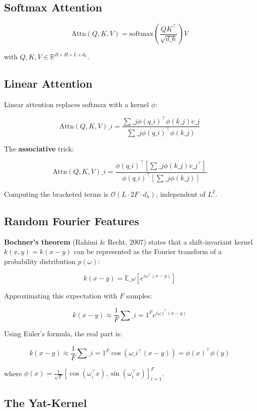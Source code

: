 \subsection{Softmax Attention}

\[
\text{Attn}(Q, K, V) = \text{softmax}\!\left(\frac{Q K^\top}{\sqrt{d\_h}}\right) V
\]

with $Q, K, V \in \mathbb{R}^{B \times H \times L \times d_h}$.

\subsection{Linear Attention}

Linear attention replaces softmax with a kernel $\phi$:

\[
\text{Attn}(Q, K, V)\_i = \frac{\sum\_j \phi(q\_i)^\top \phi(k\_j) v\_j}{\sum\_j \phi(q\_i)^\top \phi(k\_j)}
\]

The \textbf{associative} trick:

\[
\text{Attn}(Q, K, V)\_i = \frac{\phi(q\_i)^\top \left[ \sum\_j \phi(k\_j) v\_j^\top \right]}{\phi(q\_i)^\top \left[ \sum\_j \phi(k\_j) \right]}
\]

Computing the bracketed terms is $\mathcal{O}(L \cdot 2F \cdot d_h)$, independent of $L^2$.

\subsection{Random Fourier Features}

\textbf{Bochner's theorem} (Rahimi \& Recht, 2007) states that a shift-invariant 
kernel $k(x, y) = k(x - y)$ can be represented as the Fourier transform of 
a probability distribution $p(\omega)$:

\[
k(x - y) = \mathbb{E}\_\omega [e^{i \omega^\top (x - y)}]
\]

Approximating this expectation with $F$ samples:

\[
k(x - y) \approx \frac{1}{F} \sum\_{i=1}^{F} e^{i \omega\_i^\top (x - y)}
\]

Using Euler's formula, the real part is:

\[
k(x - y) \approx \frac{1}{F} \sum\_{i=1}^{F} \cos(\omega\_i^\top (x - y))
= \phi(x)^\top \phi(y)
\]

where $\phi(x) = \frac{1}{\sqrt{F}} [\cos(\omega_i^\top x), \sin(\omega_i^\top x)]_{i=1}^F$.

\subsection{The Yat-Kernel}

